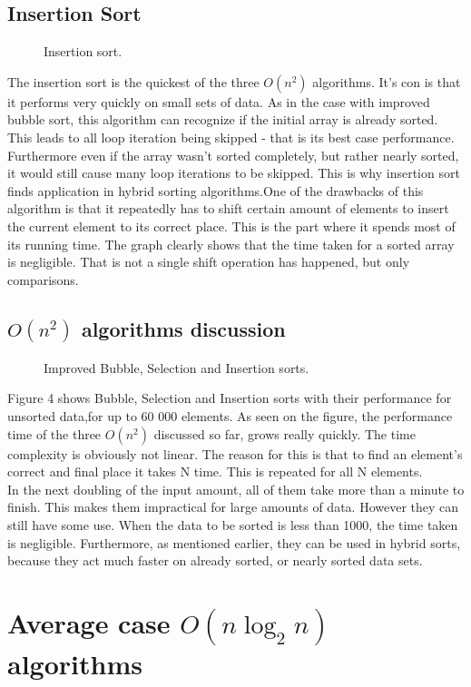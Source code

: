 \documentclass{acm_proc_article-sp}
\begin{document}
\subsection{Insertion Sort}
\begin{figure}[h]
\caption{Insertion sort.}
\end{figure}
The insertion sort is the quickest of the three $O(n^2)$ algorithms. It's con is that it performs very quickly on small sets of data. As in the case with improved bubble sort, this algorithm can recognize if the initial array is already sorted. This leads to all loop iteration being skipped - that is its best case performance. Furthermore even if the array wasn't sorted completely, but rather nearly sorted, it would still cause many loop iterations to be skipped. This is why  insertion sort finds application in hybrid sorting algorithms.One of the drawbacks of this algorithm is that it repeatedly has to shift certain amount of elements to insert the current element to its correct place. This is the part where it spends most of its running time. The graph clearly shows that the time taken for a sorted array is negligible. That is not a single shift operation has happened, but only comparisons.
\subsection{$O(n^2)$ algorithms discussion} 
\begin{figure}[h]
\caption{Improved Bubble, Selection and Insertion sorts.}
\end{figure}
Figure 4 shows  Bubble, Selection and Insertion sorts with their performance for unsorted data,for up to 60 000 elements. As seen on the figure, the performance time of the three $O(n^2)$ discussed so far, grows really quickly.  The time complexity is obviously not linear. The reason for this is that to find an element's correct and final place it takes N time. This is repeated for all N elements. \\ In the next doubling of the input amount, all of them take more than a minute to finish. This makes them impractical for large amounts of data. However they can still have some use. When the data to be sorted is less than 1000, the time taken is negligible. Furthermore, as mentioned earlier, they can be used in hybrid sorts, because they act much faster on already sorted, or nearly sorted data sets.
\section{Average case $O(n \log_2 n)$ algorithms} 
\end{document}
